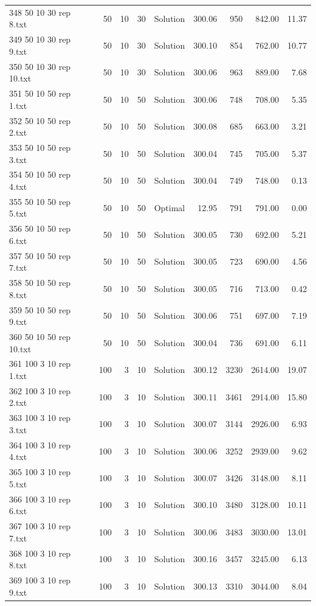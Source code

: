\begin{longtable}{lrrllrrrr}
348 50 10 30 rep 8.txt & 50 & 10 & 30 & Solution & 300.06 & 950 & 842.00 & 11.37\\
349 50 10 30 rep 9.txt & 50 & 10 & 30 & Solution & 300.10 & 854 & 762.00 & 10.77\\
350 50 10 30 rep 10.txt & 50 & 10 & 30 & Solution & 300.06 & 963 & 889.00 &  7.68\\
351 50 10 50 rep 1.txt & 50 & 10 & 50 & Solution & 300.06 & 748 & 708.00 &  5.35\\
352 50 10 50 rep 2.txt & 50 & 10 & 50 & Solution & 300.08 & 685 & 663.00 &  3.21\\
353 50 10 50 rep 3.txt & 50 & 10 & 50 & Solution & 300.04 & 745 & 705.00 &  5.37\\
354 50 10 50 rep 4.txt & 50 & 10 & 50 & Solution & 300.04 & 749 & 748.00 &  0.13\\
355 50 10 50 rep 5.txt & 50 & 10 & 50 & Optimal & 12.95 & 791 & 791.00 &  0.00\\
356 50 10 50 rep 6.txt & 50 & 10 & 50 & Solution & 300.05 & 730 & 692.00 &  5.21\\
357 50 10 50 rep 7.txt & 50 & 10 & 50 & Solution & 300.05 & 723 & 690.00 &  4.56\\
358 50 10 50 rep 8.txt & 50 & 10 & 50 & Solution & 300.05 & 716 & 713.00 &  0.42\\
359 50 10 50 rep 9.txt & 50 & 10 & 50 & Solution & 300.06 & 751 & 697.00 &  7.19\\
360 50 10 50 rep 10.txt & 50 & 10 & 50 & Solution & 300.04 & 736 & 691.00 &  6.11\\
361 100 3 10 rep 1.txt & 100 & 3 & 10 & Solution & 300.12 & 3230 & 2614.00 & 19.07\\
362 100 3 10 rep 2.txt & 100 & 3 & 10 & Solution & 300.11 & 3461 & 2914.00 & 15.80\\
363 100 3 10 rep 3.txt & 100 & 3 & 10 & Solution & 300.07 & 3144 & 2926.00 &  6.93\\
364 100 3 10 rep 4.txt & 100 & 3 & 10 & Solution & 300.06 & 3252 & 2939.00 &  9.62\\
365 100 3 10 rep 5.txt & 100 & 3 & 10 & Solution & 300.07 & 3426 & 3148.00 &  8.11\\
366 100 3 10 rep 6.txt & 100 & 3 & 10 & Solution & 300.10 & 3480 & 3128.00 & 10.11\\
367 100 3 10 rep 7.txt & 100 & 3 & 10 & Solution & 300.06 & 3483 & 3030.00 & 13.01\\
368 100 3 10 rep 8.txt & 100 & 3 & 10 & Solution & 300.16 & 3457 & 3245.00 &  6.13\\
369 100 3 10 rep 9.txt & 100 & 3 & 10 & Solution & 300.13 & 3310 & 3044.00 &  8.04\\

\end{longtable}
